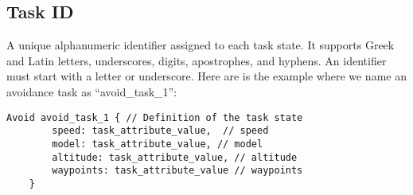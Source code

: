     
\subsection{Task ID} A unique alphanumeric identifier assigned to each task state. It supports Greek and Latin letters, underscores, digits, apostrophes, and hyphens. An identifier must start with a letter or underscore. Here are is the example where we name an avoidance task as \enquote{avoid\_task\_1}:
    \begin{lstlisting}[style=customgo]
    Avoid avoid_task_1 { // Definition of the task state
        speed: task_attribute_value,  // speed
        model: task_attribute_value, // model
        altitude: task_attribute_value, // altitude
        waypoints: task_attribute_value // waypoints
    }
    \end{lstlisting}



